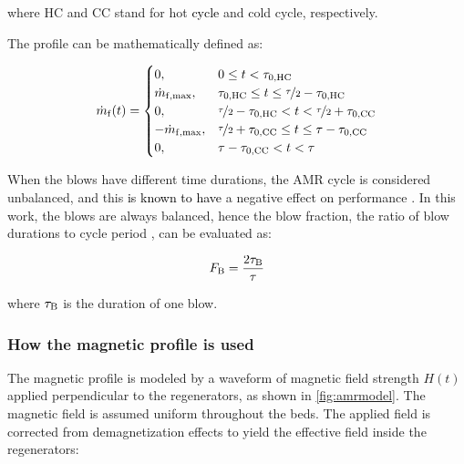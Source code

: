 \documentclass[referee]{svjour3}
\begin{document}
where HC and CC stand for hot \textcolor{black}{cycle} and cold cycle, respectively.


The profile can be mathematically defined as:

\begin{equation}
\dot{m}_{\mathrm{f}}(t)=
\begin{cases}
0, & 0 \le t < \tau_{\mathrm{0,HC}} \\
\dot{m}_{\mathrm{f,max}}, & \tau_{\mathrm{0,HC}} \le t \le \nicefrac{\tau}{2} - \tau_{\mathrm{0,HC}} \\
0, & \nicefrac{\tau}{2} - \tau_{\mathrm{0,HC}} < t < \nicefrac{\tau}{2} + \tau_{\mathrm{0,CC}} \\
-\dot{m}_{\mathrm{f,max}}, & \nicefrac{\tau}{2} + \tau_{\mathrm{0,CC}} \le t \le \tau - \tau_{\mathrm{0,CC}} \\
0, &  \tau - \tau_{\mathrm{0,CC}} <  t < \tau \\
\end{cases}
\label{eq:50}
\end{equation}

When the blows have different time durations, the AMR cycle is considered unbalanced, and this \textcolor{black}{is known to have} a negative effect on performance \cite{bib:eriksen16_effec,bib:nakashima18-influen-exp}. In this work, the blows are always balanced, hence the blow fraction, the ratio of blow durations to cycle period \cite{bib:nakashima18-influen-exp}, can be evaluated as:

\begin{equation}
\label{eq:59}
F_{\mathrm{B}} = \frac{2\tau_{\mathrm{B}}}{\tau}
\end{equation}

\noindent where $\tau_{\mathrm{B}}$ is the duration of one blow.


\subsubsection{How the magnetic profile is used}
\label{sec:how-magnetic-profile}

The magnetic profile is modeled by a waveform of magnetic field strength $H(t)$ applied perpendicular to the regenerators, as shown in \autoref{fig:amrmodel}. The magnetic field is assumed uniform throughout the beds. The applied field is corrected from demagnetization effects to yield the effective field inside the regenerators:
\end{document}
